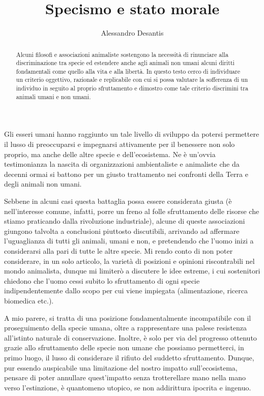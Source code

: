 \documentclass[a4paper,11pt,oneside,article]{memoir}
\title{Specismo e stato morale}
\author{Alessandro Desantis}
\date{}
\begin{document}
\begin{titlingpage}
\maketitle

\begin{abstract}
\noindent Alcuni filosofi e associazioni animaliste sostengono la necessità di
rinunciare alla discriminazione tra specie ed estendere anche agli animali non
umani alcuni diritti fondamentali come quello alla vita e alla libertà. In
questo testo cerco di individuare un criterio oggettivo, razionale e replicabile
con cui si possa valutare la sofferenza di un individuo in seguito al proprio
sfruttamento e dimostro come tale criterio discrimini tra animali umani e non
umani.
\end{abstract}
\end{titlingpage}

Gli esseri umani hanno raggiunto un tale livello di sviluppo da potersi
permettere il lusso di preoccuparsi e impegnarsi attivamente per il benessere
non solo proprio, ma anche delle altre specie e dell'ecosistema. Ne è un'ovvia
testimonianza la nascita di organizzazioni ambientaliste e animaliste che da
decenni ormai si battono per un giusto trattamento nei confronti della Terra e
degli animali non umani.

Sebbene in alcuni casi questa battaglia possa essere considerata giusta (è
nell'interesse comune, infatti, porre un freno al folle sfruttamento delle
risorse che stiamo praticando dalla rivoluzione industriale), alcune di queste
associazioni giungono talvolta a conclusioni piuttosto discutibili, arrivando ad
affermare l'uguaglianza di tutti gli animali, umani e non, e pretendendo che
l'uomo inizi a considerarsi alla pari di tutte le altre specie. Mi rendo conto
di non poter considerare, in un solo articolo, la varietà di posizioni e
opinioni riscontrabili nel mondo animalista, dunque mi limiterò a discutere le
idee estreme, i cui sostenitori chiedono che l'uomo cessi subito lo sfruttamento
di ogni specie indipendentemente dallo scopo per cui viene impiegata
(alimentazione, ricerca biomedica etc.).

A mio parere, si tratta di una posizione fondamentalmente incompatibile con il
proseguimento della specie umana, oltre a rappresentare una palese resistenza
all'istinto naturale di conservazione. Inoltre, è solo per via del progresso
ottenuto grazie allo sfruttamento delle specie non umane che possiamo
permetterci, in primo luogo, il lusso di considerare il rifiuto del suddetto
sfruttamento. Dunque, pur essendo auspicabile una limitazione del nostro impatto
sull'ecosistema, pensare di poter annullare quest'impatto senza trotterellare
mano nella mano verso l'estinzione, è quantomeno utopico, se non addirittura
ipocrita e ingenuo.
\end{document}
